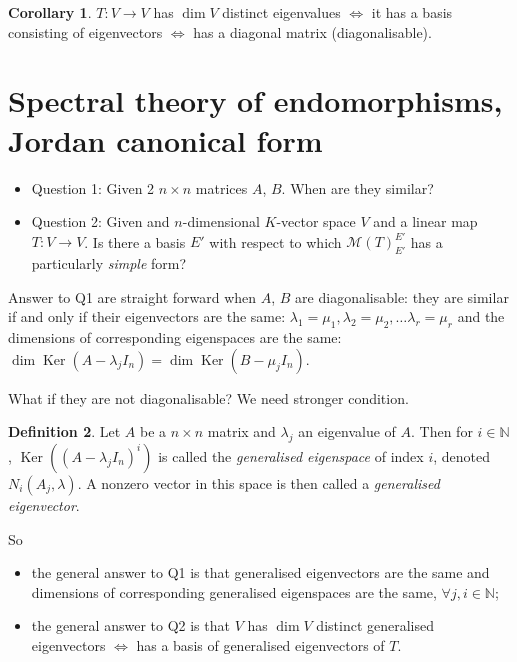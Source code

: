 \documentclass[a4paper]{article}
\newcommand{\Ker}{\operatorname{Ker}}
\theoremstyle{definition}
\newtheorem{defn}{Definition}[subsection]
\newtheorem{coro}[defn]{Corollary}
\begin{document}
\begin{coro}
$T:V\rightarrow V$ has $\dim V$ distinct eigenvalues $\Leftrightarrow$ it has a basis consisting of eigenvectors $\Leftrightarrow$ has a diagonal matrix (diagonalisable).
\end{coro}

\section{Spectral theory of endomorphisms, Jordan canonical form}
\begin{itemize}
	\item Question 1: Given 2 $n\times n$ matrices $A$, $B$. When are they similar?
	\item Question 2: Given and $n$-dimensional $K$-vector space $V$ and a linear map $T:V\rightarrow V$. Is there a basis $E'$ with respect to which $\mathcal M(T)_{E'}^{E'}$ has a particularly \textit{simple} form?
\end{itemize}

Answer to Q1 are straight forward when $A$, $B$ are diagonalisable: they are similar if and only if their eigenvectors are the same: $\lambda_1=\mu_1, \lambda_2=\mu_2,\ldots \lambda_r=\mu_r$ and the dimensions of corresponding eigenspaces are the same: $\dim \Ker (A-\lambda_j I_n) = \dim \Ker (B-\mu_j I_n)$.

What if they are not diagonalisable? We need stronger condition.

\begin{defn}
	Let $A$ be a $n\times n$ matrix and $\lambda_j$ an eigenvalue of $A$. Then for $i \in \mathbb N$, $\Ker \left( (A-\lambda_j I_n)^i \right)$ is called the \textit{generalised eigenspace} of index $i$, denoted $N_i (A_j, \lambda)$. A nonzero vector in this space is then called a \textit{generalised eigenvector}.
\end{defn}

So \begin{itemize}
	\item the general answer to Q1 is that generalised eigenvectors are the same and dimensions of corresponding generalised eigenspaces are the same, $\forall j,i \in \mathbb N$;
	\item the general answer to Q2 is that $V$ has $\dim V$ distinct generalised eigenvectors $\Leftrightarrow$ has a basis of generalised eigenvectors of $T$.
\end{itemize}
\end{document}
